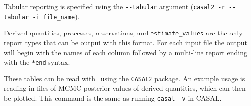 Tabular reporting is specified using the \texttt{-{}-tabular} argument (\texttt{casal2 -r -{}-tabular -i file\_name}).

Derived quantities, processes, observations, and \texttt{estimate\_values} are the only report types that can be output with this format. For each input file the output will begin with the names of each column followed by a multi-line report ending with the \texttt{*end} syntax.

These tables can be read with \R\ using the \texttt{CASAL2} package. An example usage is reading in files of MCMC posterior values of derived quantities, which can then be plotted. This command is the same as running \texttt{casal -v} in CASAL.



